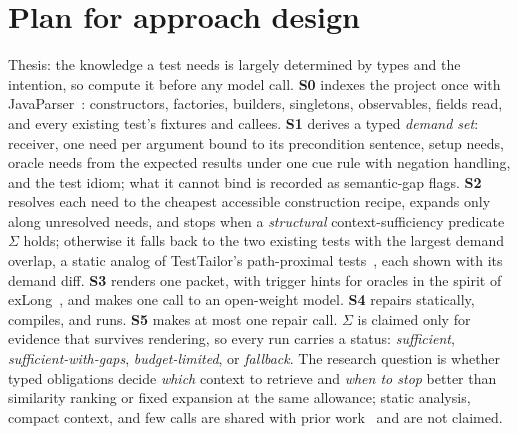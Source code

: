 \documentclass[10pt]{article}
\newcommand{\suff}{\ensuremath{\Sigma}\xspace}
\begin{document}
\section*{Plan for approach design}
Thesis: the knowledge a test needs is largely determined by types and the intention, so compute it before any model call. \textbf{S0} indexes the project once with JavaParser~\cite{javaparser}: constructors, factories, builders, singletons, observables, fields read, and every existing test's fixtures and callees. \textbf{S1} derives a typed \emph{demand set}: receiver, one need per argument bound to its precondition sentence, setup needs, oracle needs from the expected results under one cue rule with negation handling, and the test idiom; what it cannot bind is recorded as semantic-gap flags. \textbf{S2} resolves each need to the cheapest accessible construction recipe, expands only along unresolved needs, and stops when a \emph{structural} context-sufficiency predicate \suff holds; otherwise it falls back to the two existing tests with the largest demand overlap, a static analog of TestTailor's path-proximal tests~\cite{zhou2026testtailor}, each shown with its demand diff. \textbf{S3} renders one packet, with trigger hints for oracles in the spirit of exLong~\cite{zhang2025exlong}, and makes one call to an open-weight model. \textbf{S4} repairs statically, compiles, and runs. \textbf{S5} makes at most one repair call. \suff is claimed only for evidence that survives rendering, so every run carries a status: \emph{sufficient}, \emph{sufficient-with-gaps}, \emph{budget-limited}, or \emph{fallback}. The research question is whether typed obligations decide \emph{which} context to retrieve and \emph{when to stop} better than similarity ranking or fixed expansion at the same allowance; static analysis, compact context, and few calls are shared with prior work~\cite{li2026ktester,chen2026catgen,ferrer2026context} and are not claimed.
\end{document}
